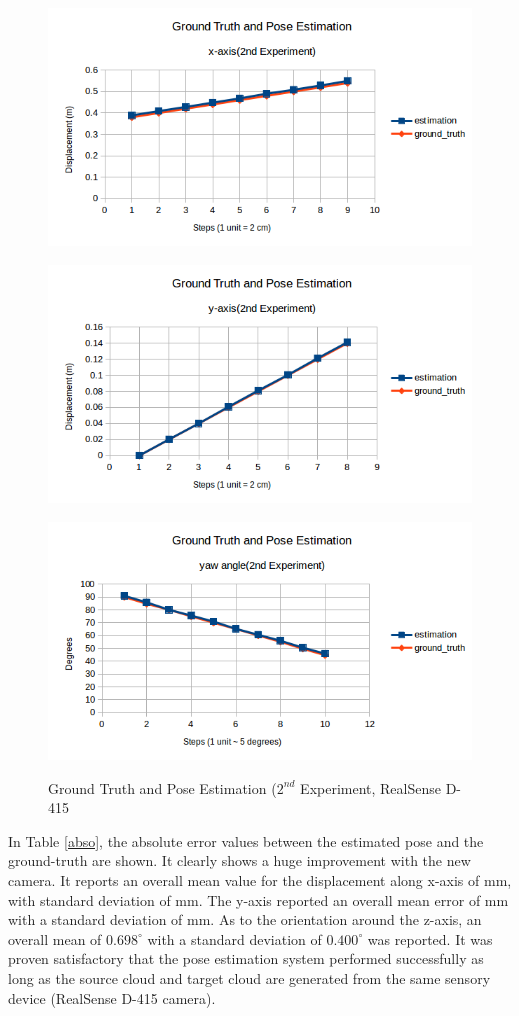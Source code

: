 \begin{figure}[htp]
\begin{center}
{
  \includegraphics[clip,width=0.7\columnwidth]{figures/x_newrealsense.png}
}
\end{center}
\begin{center}
{
  \includegraphics[clip,width=0.7\columnwidth]{figures/y_newrealsense.png}
}
\end{center}

\begin{center}
{
  \includegraphics[clip,width=0.7\columnwidth]{figures/yaw_newrealsense.png}
}
\end{center}
\caption{Ground Truth and Pose Estimation ($2^{nd}$ Experiment, RealSense D-415}
\label{newreal22}
\end{figure}

In Table \ref{abso}, the absolute error values between the estimated pose and the ground-truth are shown. It clearly shows a huge improvement with the new camera. It reports an overall mean value for the displacement along x-axis of \unit[9] {mm},  with standard deviation of \unit[1] {mm}. The y-axis reported an overall mean error of \unit[1] {mm} with a standard deviation of \unit[1] {mm}. As to the orientation around the z-axis, an overall mean of $0.698^{\circ}$ with a standard deviation of $0.400^{\circ}$ was reported. It was proven satisfactory that the pose estimation system performed successfully as long as the source cloud and target cloud are generated from the same sensory device (RealSense D-415 camera). 

